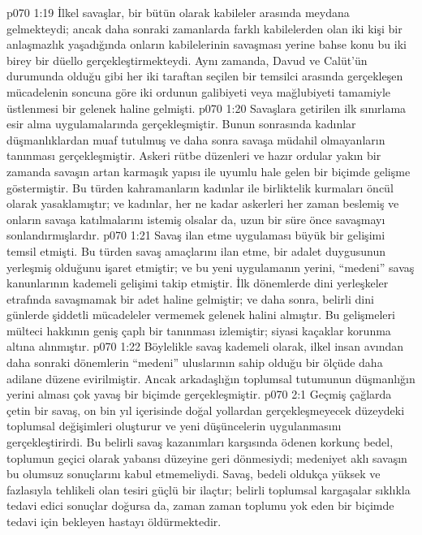 \vs p070 1:19 İlkel savaşlar, bir bütün olarak kabileler arasında meydana gelmekteydi; ancak daha sonraki zamanlarda farklı kabilelerden olan iki kişi bir anlaşmazlık yaşadığında onların kabilelerinin savaşması yerine bahse konu bu iki birey bir düello gerçekleştirmekteydi. Aynı zamanda, Davud ve Calüt’ün durumunda olduğu gibi her iki taraftan seçilen bir temsilci arasında gerçekleşen mücadelenin soncuna göre iki ordunun galibiyeti veya mağlubiyeti tamamiyle üstlenmesi bir gelenek haline gelmişti.
\vs p070 1:20 Savaşlara getirilen ilk sınırlama esir alma uygulamalarında gerçekleşmiştir. Bunun sonrasında kadınlar düşmanlıklardan muaf tutulmuş ve daha sonra savaşa müdahil olmayanların tanınması gerçekleşmiştir. Askeri rütbe düzenleri ve hazır ordular yakın bir zamanda savaşın artan karmaşık yapısı ile uyumlu hale gelen bir biçimde gelişme göstermiştir. Bu türden kahramanların kadınlar ile birliktelik kurmaları öncül olarak yasaklamıştır; ve kadınlar, her ne kadar askerleri her zaman beslemiş ve onların savaşa katılmalarını istemiş olsalar da, uzun bir süre önce savaşmayı sonlandırmışlardır.
\vs p070 1:21 Savaş ilan etme uygulaması büyük bir gelişimi temsil etmişti. Bu türden savaş amaçlarını ilan etme, bir adalet duygusunun yerleşmiş olduğunu işaret etmiştir; ve bu yeni uygulamanın yerini, “medeni” savaş kanunlarının kademeli gelişimi takip etmiştir. İlk dönemlerde dini yerleşkeler etrafında savaşmamak bir adet haline gelmiştir; ve daha sonra, belirli dini günlerde şiddetli mücadeleler vermemek gelenek halini almıştır. Bu gelişmeleri mülteci hakkının geniş çaplı bir tanınması izlemiştir; siyasi kaçaklar korunma altına alınmıştır.
\vs p070 1:22 Böylelikle savaş kademeli olarak, ilkel insan avından daha sonraki dönemlerin “medeni” uluslarının sahip olduğu bir ölçüde daha adilane düzene evirilmiştir. Ancak arkadaşlığın toplumsal tutumunun düşmanlığın yerini alması çok yavaş bir biçimde gerçekleşmiştir.
\vs p070 2:1 Geçmiş çağlarda çetin bir savaş, on bin yıl içerisinde doğal yollardan gerçekleşmeyecek düzeydeki toplumsal değişimleri oluşturur ve yeni düşüncelerin uygulanmasını gerçekleştirirdi. Bu belirli savaş kazanımları karşısında ödenen korkunç bedel, toplumun geçici olarak yabansı düzeyine geri dönmesiydi; medeniyet aklı savaşın bu olumsuz sonuçlarını kabul etmemeliydi. Savaş, bedeli oldukça yüksek ve fazlasıyla tehlikeli olan tesiri güçlü bir ilaçtır; belirli toplumsal kargaşalar sıklıkla tedavi edici sonuçlar doğursa da, zaman zaman toplumu yok eden bir biçimde tedavi için bekleyen hastayı öldürmektedir.
